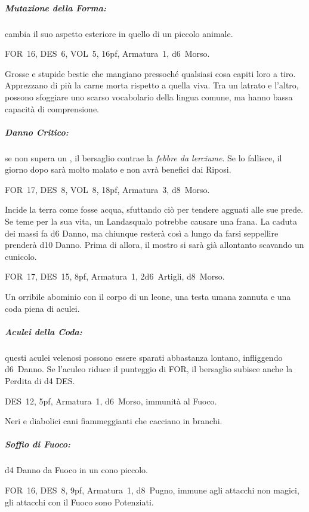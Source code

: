 \documentclass[itdr]{subfiles}
\begin{document}
\subparagraph{Mutazione della Forma:} cambia il suo aspetto esteriore in quello di un piccolo animale.

\vfill


\vspace{-2ex}

FOR~16, DES~6, VOL~5, 16pf, Armatura~1, d6~Morso.

Grosse e stupide bestie che mangiano pressoché qualsiasi cosa capiti loro a tiro. Apprezzano di più la carne morta rispetto a quella viva. Tra un latrato e l'altro, possono sfoggiare uno scarso vocabolario della lingua comune, ma hanno bassa capacità di comprensione.

\subparagraph{Danno Critico:} se non supera un , il bersaglio contrae la {\em febbre da lerciume}. Se lo fallisce, il giorno dopo sarà molto malato e non avrà benefici dai Riposi.

\vfill

FOR~17, DES~8, VOL~8, 18pf, Armatura~3, d8~Morso.

Incide la terra come fosse acqua, sfuttando ciò per tendere agguati alle sue prede. Se teme per la sua vita, un Landasqualo potrebbe causare una frana. La caduta dei massi fa d6 Danno, ma chiunque resterà così a lungo da farsi seppellire prenderà d10 Danno. Prima di allora, il mostro si sarà già allontanto scavando un cunicolo.

\vfill

FOR~17, DES~15, 8pf, Armatura~1, 2d6~Artigli, d8~Morso.

Un orribile abominio con il corpo di un leone, una testa umana zannuta e una coda piena di aculei.

\subparagraph{Aculei della Coda:} questi aculei velenosi possono essere sparati abbastanza lontano, infliggendo d6~Danno. Se l'aculeo riduce il punteggio di FOR, il bersaglio subisce anche la Perdita di d4 DES.

\vfill

DES~12, 5pf, Armatura~1, d6~Morso, immunità al Fuoco.

Neri e diabolici cani fiammeggianti che cacciano in branchi.

\subparagraph{Soffio di Fuoco:} d4 Danno da Fuoco in un cono piccolo.

\vfill

FOR~16, DES~8, 9pf, Armatura~1, d8~Pugno, immune agli attacchi non magici, gli attacchi con il Fuoco sono Potenziati.
\end{document}
